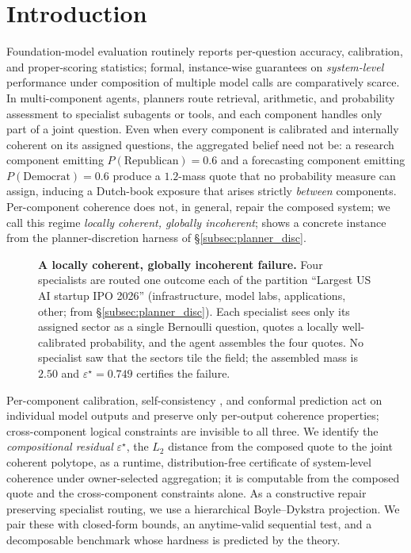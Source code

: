 \documentclass{article}
\theoremstyle{plain}
\theoremstyle{definition}
\theoremstyle{remark}
\newcommand{\eps}{\varepsilon}
\begin{document}
\section{Introduction}
\label{sec:intro}

Foundation-model evaluation routinely reports per-question
accuracy, calibration, and proper-scoring statistics; formal,
instance-wise guarantees on \emph{system-level} performance under
composition of multiple model calls are comparatively scarce. In
multi-component agents, planners route retrieval, arithmetic, and
probability assessment to specialist subagents or tools, and each
component handles only part of a joint question. Even when every
component is calibrated and internally coherent on its assigned
questions, the aggregated belief need not be: a research component
emitting $P(\text{Republican}){=}0.6$ and a forecasting component
emitting $P(\text{Democrat}){=}0.6$ produce a $1.2$-mass quote that
no probability measure can assign, inducing a Dutch-book exposure
\citep{definetti1937foresight} that arises strictly \emph{between}
components. Per-component coherence does not, in general, repair
the composed system; we call this regime \emph{locally coherent,
globally incoherent};  shows a concrete instance
from the planner-discretion harness of \S\ref{subsec:planner_disc}.

\begin{figure}[t]
\centering
\resizebox{\linewidth}{!}{}
\caption{\textbf{A locally coherent, globally incoherent failure.}
Four specialists are routed one outcome each of the partition
``Largest US AI startup IPO 2026'' (infrastructure, model labs,
applications, other; from \S\ref{subsec:planner_disc}). Each
specialist sees only its assigned sector as a single Bernoulli
question, quotes a locally well-calibrated probability, and the
agent assembles the four quotes. No specialist saw that the
sectors tile the field; the assembled mass is $2.50$ and
$\eps^\star\!=\!0.749$ certifies the failure.}
\label{fig:iconic}
\end{figure}

Per-component calibration, self-consistency
\citep{wang2023selfconsistency}, and conformal prediction
\citep{angelopoulos2021gentle} act on individual model outputs and
preserve only per-output coherence properties; cross-component
logical constraints are invisible to all three. We identify the
\emph{compositional residual} $\eps^\star$, the $L_2$ distance
from the composed quote to the joint coherent polytope, as a
runtime, distribution-free certificate of system-level coherence
under owner-selected aggregation; it is computable from the
composed quote and the cross-component constraints alone. As a
constructive repair preserving specialist routing, we use a
hierarchical Boyle--Dykstra projection. We pair these with closed-form bounds, an
anytime-valid sequential test, and a decomposable benchmark whose
hardness is predicted by the theory.
\end{document}
